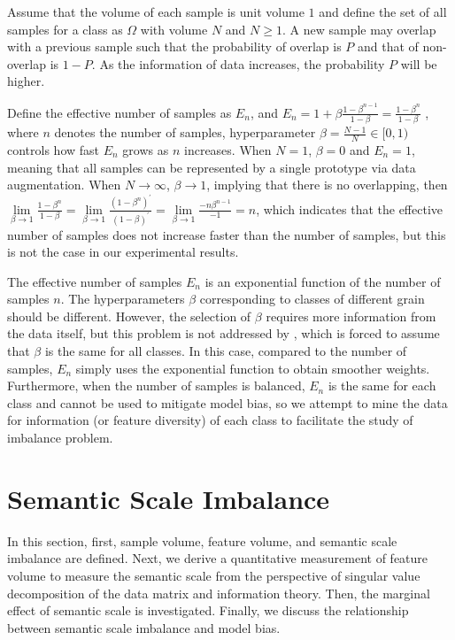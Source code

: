 \documentclass[10pt]{article} %
\begin{document}
Assume that the volume of each sample is unit volume $1$ and define the set of all samples for a class as $\Omega$ with volume $N$ and $N\!\!\ge\!\!1$. A new sample may overlap with a previous sample such that the probability of overlap is $P$ and that of non-overlap is $1\!\!-\!\!P$. As the information of data increases, the probability $P$ will be higher. 

Define the effective number of samples as ${E_n}$, and ${E_n} = 1 + \beta \frac{{1 - {\beta ^{n - 1}}}}{{1 - \beta }} = \frac{{1 - {\beta ^n}}}{{1 - \beta }}$ \cite {paper14}, where $n$ denotes the number of samples, hyperparameter $\beta = \frac{{N - 1}}{N} \in [ {0,1} )$ controls how fast ${E_n}$ grows as $n$ increases. When $N = 1$, $\beta  = 0$ and ${E_n}= 1$, meaning that all samples can be represented by a single prototype via data augmentation. When $N \to \infty $, $\beta  \to 1$, implying that there is no overlapping, then $\mathop {\lim }\limits_{\beta  \to 1 } \!\!\frac{{1 - {\beta ^n}}}{{1 - \beta }} \!\!= \!\!\mathop {\lim }\limits_{\beta  \to 1 } \!\!\frac{{{{\left( {1 - {\beta ^n}} \right)}^\prime }}}{{{{\left( {1 - \beta } \right)}^\prime }}} \!\!= \!\!\mathop {\lim }\limits_{\beta  \to 1 } \!\!\frac{{ - n{\beta ^{n - 1}}}}{{ - 1}} \!\!= \!\!n$, which indicates that the effective number of samples does not increase faster than the number of samples, but this is not the case in our experimental results.

The effective number of samples ${E_n}$ is an exponential function of the number of samples $n$. The hyperparameters $\beta$ corresponding to classes of different grain should be different. However, the selection of $\beta$ requires more information from the data itself, but this problem is not addressed by \cite {paper14}, which is forced to assume that $\beta$ is the same for all classes. In this case, compared to the number of samples, ${E_n}$ simply uses the exponential function to obtain smoother weights. Furthermore, when the number of samples is balanced, ${E_n}$ is the same for each class and cannot be used to mitigate model bias, so we attempt to mine the data for information (or feature diversity) of each class to facilitate the study of imbalance problem.


\section{Semantic Scale Imbalance}
In this section, first, sample volume, feature volume, and semantic scale imbalance are defined. Next, we derive a quantitative measurement of feature volume to measure the semantic scale from the perspective of singular value decomposition of the data matrix and information theory. Then, the marginal effect of semantic scale is investigated. Finally, we discuss the relationship between semantic scale imbalance and model bias.
\end{document}
